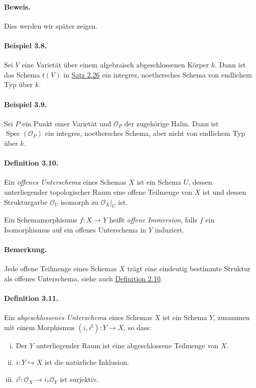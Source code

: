 \documentclass[11pt,b5paper,openany]{memoir}
\begin{document}
\paragraph{Beweis.} Dies werden wir später zeigen.

\paragraph{Beispiel 3.8.}\label{3.8} Sei $V$ eine Varietät über einem algebraisch abgeschlossenen Körper $k$. Dann ist das Schema $t(V)$ in \hyperref[2.26]{Satz 2.26} ein integres, noethersches Schema von endlichem Typ über $k$.

\paragraph{Beispiel 3.9.}\label{3.9} Sei $P$ ein Punkt einer Varietät und $\mathcal{O}_P$ der zugehörige Halm. Dann ist $\operatorname{Spec}(\mathcal{O}_P)$ ein integres, noethersches Schema, aber nicht von endlichem Typ über $k$.

\paragraph{Definition 3.10.}\label{3.10} Ein \textit{offenes Unterschema} eines Schemas $X$ ist ein Schema $U$, dessen unterliegender topologischer Raum eine offene Teilmenge von $X$ ist und dessen Strukturgarbe $\mathcal{O}_U$ isomorph zu $\mathcal{O}_X|_U$ ist.

Ein Schemamorphismus $f:X\to Y$ heißt \textit{offene Immersion}, falls $f$ ein Isomorphismus auf ein offenes Unterschema in $Y$ induziert.

\paragraph{Bemerkung.} Jede offene Teilmenge eines Schemas $X$ trägt eine eindeutig bestimmte Struktur als offenes Unterschema, siehe auch \hyperref[2.10]{Definition 2.10}.

\paragraph{Definition 3.11.}\label{3.11} Ein \textit{abgeschlossenes Unterschema} eines Schemas $X$ ist ein Schema $Y$, zusammen mit einem Morphismus $(i,i^\sharp):Y\to X$, so dass:
\begin{enumerate}[(i)]
\item Der $Y$ unterliegender Raum ist eine abgeschlossene Teilmenge von $X$.
\item $i:Y\hookrightarrow X$ ist die natürliche Inklusion.
\item $i^\sharp:\mathcal{O}_X\to i_\ast\mathcal{O}_Y$ ist surjektiv.
\end{enumerate}
\end{document}
